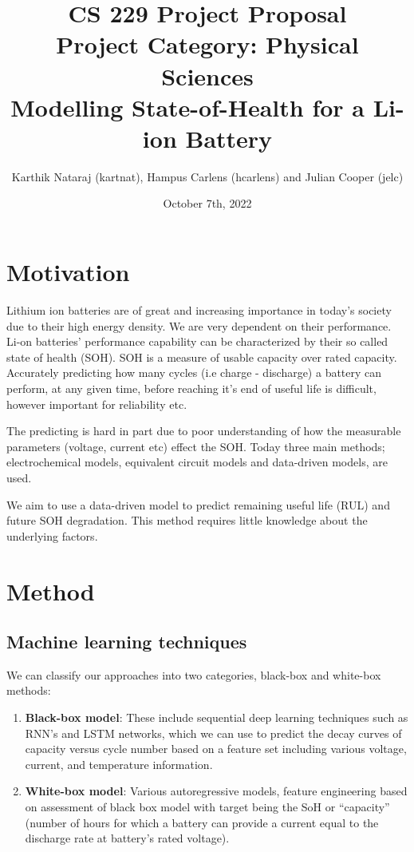 \documentclass{article}
\title{%
    CS 229 Project Proposal \\
    Project Category: Physical Sciences \\
    Modelling State-of-Health for a Li-ion Battery}
\author{Karthik Nataraj (kartnat), Hampus Carlens (hcarlens) and Julian Cooper (jelc)}
\date{October 7th, 2022}
\begin{document}
\maketitle

\section{Motivation}
Lithium ion batteries are of great and increasing importance in today's society due to their high energy density. We are very dependent on their performance. Li-on batteries' performance capability can be characterized by their so called state of health (SOH). SOH is a measure of usable capacity over rated capacity. Accurately predicting how many cycles (i.e charge - discharge) a battery can perform, at any given time, before reaching it’s end of useful life is difficult, however important for reliability etc. 

The predicting is hard in part due to poor understanding of how the measurable parameters (voltage, current etc) effect the SOH. Today three main methods; electrochemical models, equivalent circuit models and data-driven models, are used.

We aim to use a data-driven model to predict remaining useful life (RUL) and future SOH degradation. This method requires little knowledge about the underlying factors.    

\section{Method}
\subsection{Machine learning techniques}
We can classify our approaches into two categories, black-box and white-box methods:
\begin{enumerate}
    \item \textbf{Black-box model}: These include sequential deep learning techniques such as RNN's and LSTM networks, which we can use to predict the decay curves of capacity versus cycle number based on a feature set including various voltage, current, and temperature information. 
    \item \textbf{White-box model}: Various autoregressive models, feature engineering based on assessment of black box model with target being the SoH or “capacity” (number of hours for which a battery can provide a current equal to the discharge rate at battery’s rated voltage).
\end{enumerate}
\end{document}
